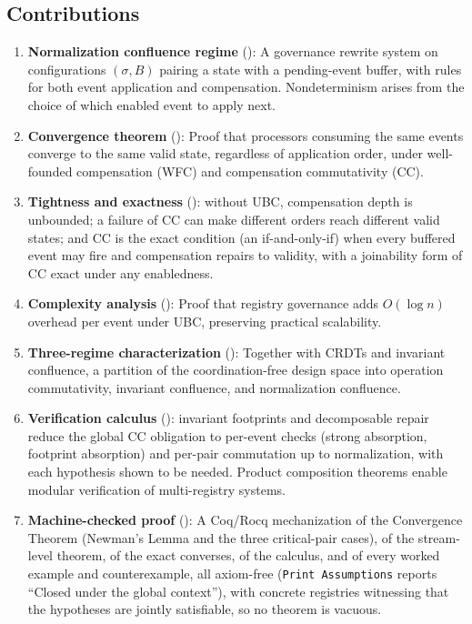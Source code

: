 \documentclass[11pt,a4paper]{article}
\theoremstyle{plain}
\theoremstyle{definition}
\theoremstyle{remark}
\begin{document}
\subsection{Contributions}

\begin{enumerate}[leftmargin=*,nosep]
\item \textbf{Normalization confluence regime} (): A
  governance rewrite system on configurations $(\sigma, B)$ pairing a state
  with a pending-event buffer, with rules for both event application and
  compensation.  Nondeterminism arises from the choice of which enabled event
  to apply next.
\item \textbf{Convergence theorem} (): Proof that
  processors consuming the same events converge to the same valid state,
  regardless of application order, under well-founded compensation (WFC) and
  compensation commutativity (CC).
\item \textbf{Tightness and exactness} (): without UBC,
  compensation depth is unbounded; a failure of CC can make different orders
  reach different valid states; and CC is the exact condition (an
  if-and-only-if) when every buffered event may fire and compensation repairs
  to validity, with a joinability form of CC exact under any enabledness.
\item \textbf{Complexity analysis} (): Proof that
  registry governance adds $O(\log n)$ overhead per event under UBC,
  preserving practical scalability.
\item \textbf{Three-regime characterization} ():
  Together with CRDTs and invariant confluence, a partition of the
  coordination-free design space into operation commutativity, invariant
  confluence, and normalization confluence.
\item \textbf{Verification calculus} (): invariant
  footprints and decomposable repair reduce the global CC obligation to
  per-event checks (strong absorption, footprint absorption) and per-pair
  commutation up to normalization, with each hypothesis shown to be needed.
  Product composition theorems enable modular verification of multi-registry
  systems.
\item \textbf{Machine-checked proof} (): A Coq/Rocq
  mechanization of the Convergence Theorem (Newman's Lemma and the three
  critical-pair cases), of the stream-level theorem, of the exact converses,
  of the calculus, and of every worked example and counterexample, all
  axiom-free (\texttt{Print Assumptions} reports ``Closed under the global
  context''), with concrete registries witnessing that the hypotheses are
  jointly satisfiable, so no theorem is vacuous.
\end{enumerate}
\end{document}

